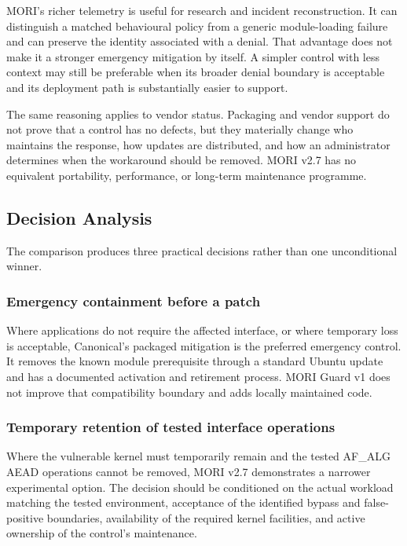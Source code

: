 MORI's richer telemetry is useful for research and incident reconstruction. It
can distinguish a matched behavioural policy from a generic module-loading
failure and can preserve the identity associated with a denial. That advantage
does not make it a stronger emergency mitigation by itself. A simpler control
with less context may still be preferable when its broader denial boundary is
acceptable and its deployment path is substantially easier to support.

The same reasoning applies to vendor status. Packaging and vendor support do not
prove that a control has no defects, but they materially change who maintains
the response, how updates are distributed, and how an administrator determines
when the workaround should be removed. MORI v2.7 has no equivalent portability,
performance, or long-term maintenance programme.

\subsection{Decision Analysis}

The comparison produces three practical decisions rather than one unconditional
winner.

\subsubsection{Emergency containment before a patch}

Where applications do not require the affected interface, or where temporary
loss is acceptable, Canonical's packaged mitigation is the preferred emergency
control. It removes the known module prerequisite through a standard Ubuntu
update and has a documented activation and retirement process. MORI Guard v1
does not improve that compatibility boundary and adds locally maintained code.

\subsubsection{Temporary retention of tested interface operations}

Where the vulnerable kernel must temporarily remain and the tested AF\_ALG AEAD
operations cannot be removed, MORI v2.7 demonstrates a narrower experimental
option. The decision should be conditioned on the actual workload matching the
tested environment, acceptance of the identified bypass and false-positive
boundaries, availability of the required kernel facilities, and active
ownership of the control's maintenance.

